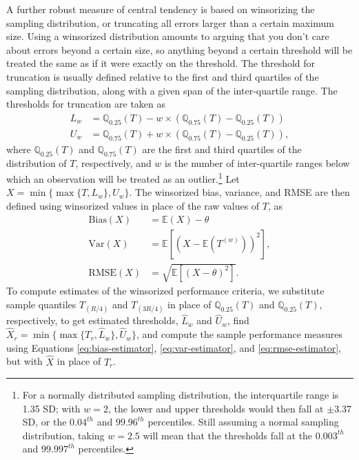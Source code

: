 \documentclass[
]{book}
\newcommand{\E}{\mathbb{E}}
\newcommand{\Q}{\mathbb{Q}}
\newcommand{\Var}{\text{Var}}
\newcommand{\RMSE}{\text{RMSE}}
\begin{document}
A further robust measure of central tendency is based on winsorizing the sampling distribution, or truncating all errors larger than a certain maximum size.
Using a winsorized distribution amounts to arguing that you don't care about errors beyond a certain size, so anything beyond a certain threshold will be treated the same as if it were exactly on the threshold.
The threshold for truncation is usually defined relative to the first and third quartiles of the sampling distribution, along with a given span of the inter-quartile range.
The thresholds for truncation are taken as
\[
\begin{aligned}
L_w &= \Q_{0.25}(T) - w \times (\Q_{0.75}(T) - \Q_{0.25}(T)) \\ 
U_w &= \Q_{0.75}(T) + w \times (\Q_{0.75}(T) - \Q_{0.25}(T)),
\end{aligned}
\]
where \(\Q_{0.25}(T)\) and \(\Q_{0.75}(T)\) are the first and third quartiles of the distribution of \(T\), respectively, and \(w\) is the number of inter-quartile ranges below which an observation will be treated as an outlier.\footnote{For a normally distributed sampling distribution, the interquartile range is 1.35 SD; with \(w = 2\), the lower and upper thresholds would then fall at \(\pm 3.37\) SD, or the \(0.04^{th}\) and \(99.96^{th}\) percentiles.
  Still assuming a normal sampling distribution, taking \(w = 2.5\) will mean that the thresholds fall at the \(0.003^{th}\) and \(99.997^{th}\) percentiles.}
Let \(X = \min\{\max\{T, L_w\}, U_w\}\).
The winsorized bias, variance, and RMSE are then defined using winsorized values in place of the raw values of \(T\), as
\[
\begin{aligned}
\text{Bias}(X) &= \E\left(X\right) - \theta \\
\Var\left(X\right) &= \E\left[\left(X - \E (T^{(w)})\right)^2 \right], \\
\RMSE\left(X\right) &= \sqrt{\E\left[\left(X - \theta\right)^2 \right]}.
\end{aligned}
\label{eq:winsorized-variance-RMSE}
\]
To compute estimates of the winsorized performance criteria, we substitute sample quantiles \(T_{(R/4)}\) and \(T_{(3R/4)}\) in place of \(\Q_{0.25}(T)\) and \(\Q_{0.25}(T)\), respectively, to get estimated thresholds, \(\hat{L}_w\) and \(\hat{U}_w\), find \(\hat{X}_r = \min\{\max\{T_r, \hat{L}_w\}, \hat{U}_w\}\), and compute the sample performance measures using Equations \eqref{eq:bias-estimator}, \eqref{eq:var-estimator}, and \eqref{eq:rmse-estimator}, but with \(\hat{X}\) in place of \(T_r\).
\end{document}
